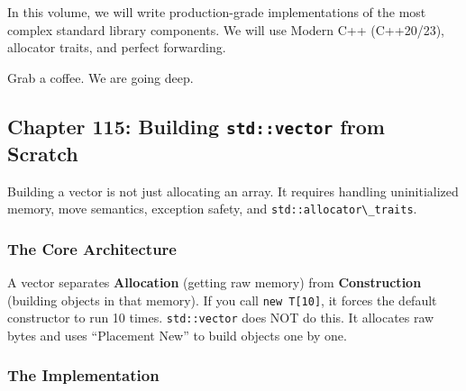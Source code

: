 In this volume, we will write production-grade implementations of the
most complex standard library components. We will use Modern C++
(C++20/23), allocator traits, and perfect forwarding.

Grab a coffee. We are going deep.

\hypertarget{chapter-115-building-stdvector-from-scratch}{%
\subsection{\texorpdfstring{Chapter 115: Building \texttt{std::vector}
from
Scratch}{Chapter 115: Building std::vector from Scratch}}\label{chapter-115-building-stdvector-from-scratch}}

Building a vector is not just allocating an array. It requires handling
uninitialized memory, move semantics, exception safety, and
\passthrough{\lstinline!std::allocator\_traits!}.

\hypertarget{the-core-architecture}{%
\subsubsection{The Core Architecture}\label{the-core-architecture}}

A vector separates \textbf{Allocation} (getting raw memory) from
\textbf{Construction} (building objects in that memory). If you call
\passthrough{\lstinline!new T[10]!}, it forces the default constructor
to run 10 times. \passthrough{\lstinline!std::vector!} does NOT do this.
It allocates raw bytes and uses ``Placement New'' to build objects one
by one.

\hypertarget{the-implementation}{%
\subsubsection{The Implementation}\label{the-implementation}}

